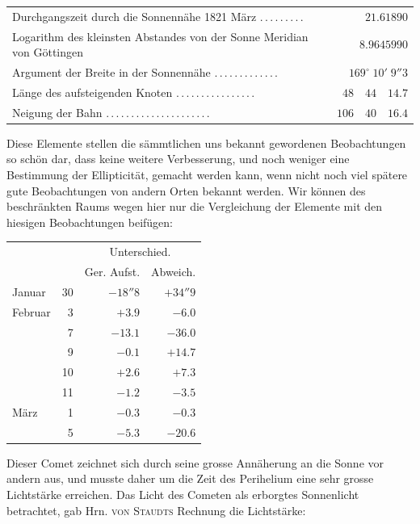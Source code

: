 \begin{center}
\small
\begin{tabular}{p{.73\linewidth}r}
Durchgangszeit durch die Sonnennähe 1821 März \mbox{.\,.\,.\,.\,.\,.\,.\,.\,.} & $21.61890$ \\
Logarithm des kleinsten Abstandes von der Sonne Meridian von Göttingen & $8.9645990$ \\
Argument der Breite in der Sonnennähe \mbox{.\,.\,.\,.\,.\,.\,.\,.\,.\,.\,.\,.\,.} & $169^\circ\;10'\;9''3$ \\
Länge des aufsteigenden Knoten \mbox{.\,.\,.\,.\,.\,.\,.\,.\,.\,.\,.\,.\,.\,.\,.\,.} & $48\quad44\quad14.7$ \\
Neigung der Bahn \mbox{.\,.\,.\,.\,.\,.\,.\,.\,.\,.\,.\,.\,.\,.\,.\,.\,.\,.\,.\,.\,.} & $106\quad40\quad16.4$ \\
\end{tabular}
\end{center}

Diese Elemente stellen die sämmtlichen uns bekannt gewordenen Beobachtungen so schön dar, dass keine weitere Verbesserung, und noch weniger eine Bestimmung der Ellipticität, gemacht werden kann, wenn nicht noch viel spätere gute Beobachtungen von andern Orten bekannt werden. Wir können des beschränkten Raums wegen hier nur die Vergleichung der Elemente mit den hiesigen Beobachtungen beifügen:

\begin{center}
\begin{tabular}{lr|r|r}
& & \multicolumn{2}{c}{Unterschied.} \\
& & Ger. Aufst. & Abweich. \\
\hline
Januar & 30 & $-18''8$ & $+34''9$ \\
Februar & 3 & $+3.9$ & $-6.0$ \\
& 7 & $-13.1$ & $-36.0$ \\
& 9 & $-0.1$ & $+14.7$ \\
& 10 & $+2.6$ & $+7.3$ \\
& 11 & $-1.2$ & $-3.5$ \\
März & 1 & $-0.3$ & $-0.3$ \\
& 5 & $-5.3$ & $-20.6$ \\
\end{tabular}
\end{center}

Dieser Comet zeichnet sich durch seine grosse Annäherung an die Sonne vor andern aus, und musste daher um die Zeit des Perihelium eine sehr grosse Lichtstärke erreichen. Das Licht des Cometen als erborgtes Sonnenlicht betrachtet, gab Hrn. \textsc{von Staudts} Rechnung die Lichtstärke:

